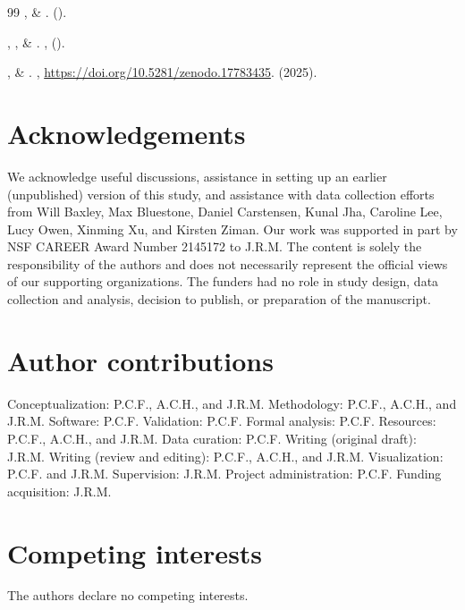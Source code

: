 \documentclass[10pt]{article}
\begin{document}
\begin{thebibliography}{99}
,  \&
\newblock {}.
\newblock \emph{} \textbf{}
  ().

, ,
   \& 
\newblock {}.
\newblock \emph{}
  \textbf{},  ().
  
,  \& 
\newblock {}.
, \url{https://doi.org/10.5281/zenodo.17783435}. (2025).

\end{thebibliography}


\section*{Acknowledgements}

We acknowledge useful discussions, assistance in setting up an earlier
(unpublished) version of this study, and assistance with data collection
efforts from Will Baxley, Max Bluestone, Daniel Carstensen, Kunal Jha, Caroline
Lee, Lucy Owen, Xinming Xu, and Kirsten Ziman. Our work was supported in part
by NSF CAREER Award Number 2145172 to J.R.M. The content is solely the
responsibility of the authors and does not necessarily represent the official
views of our supporting organizations. The funders had no role in study design,
data collection and analysis, decision to publish, or preparation of the
manuscript.


\section*{Author contributions}

Conceptualization: P.C.F., A.C.H., and J.R.M. Methodology: P.C.F., A.C.H., and
J.R.M. Software: P.C.F. Validation: P.C.F. Formal analysis: P.C.F. Resources: P.C.F.,
A.C.H., and J.R.M. Data curation: P.C.F. Writing (original draft): J.R.M. Writing
(review and editing): P.C.F., A.C.H., and J.R.M. Visualization: P.C.F. and J.R.M.
Supervision: J.R.M. Project administration: P.C.F. Funding acquisition: J.R.M.


\section*{Competing interests}

The authors declare no competing interests.
\end{document}
